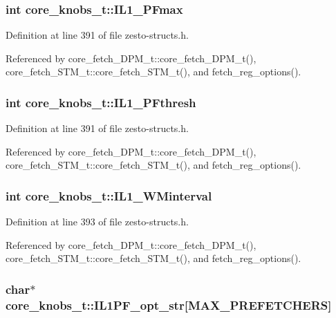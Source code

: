 \subsubsection[{IL1\_\-PFmax}]{\setlength{\rightskip}{0pt plus 5cm}int {\bf core\_\-knobs\_\-t::IL1\_\-PFmax}}\label{structcore__knobs__t_afc1c24917e1880ee984619e91c0c2ef}




Definition at line 391 of file zesto-structs.h.

Referenced by core\_\-fetch\_\-DPM\_\-t::core\_\-fetch\_\-DPM\_\-t(), core\_\-fetch\_\-STM\_\-t::core\_\-fetch\_\-STM\_\-t(), and fetch\_\-reg\_\-options().
\subsubsection[{IL1\_\-PFthresh}]{\setlength{\rightskip}{0pt plus 5cm}int {\bf core\_\-knobs\_\-t::IL1\_\-PFthresh}}\label{structcore__knobs__t_81cb78f98b406a4e4d02711775950a45}




Definition at line 391 of file zesto-structs.h.

Referenced by core\_\-fetch\_\-DPM\_\-t::core\_\-fetch\_\-DPM\_\-t(), core\_\-fetch\_\-STM\_\-t::core\_\-fetch\_\-STM\_\-t(), and fetch\_\-reg\_\-options().
\subsubsection[{IL1\_\-WMinterval}]{\setlength{\rightskip}{0pt plus 5cm}int {\bf core\_\-knobs\_\-t::IL1\_\-WMinterval}}\label{structcore__knobs__t_dcab08651b8fef497a98e71df1d59fe6}




Definition at line 393 of file zesto-structs.h.

Referenced by core\_\-fetch\_\-DPM\_\-t::core\_\-fetch\_\-DPM\_\-t(), core\_\-fetch\_\-STM\_\-t::core\_\-fetch\_\-STM\_\-t(), and fetch\_\-reg\_\-options().
\subsubsection[{IL1PF\_\-opt\_\-str}]{\setlength{\rightskip}{0pt plus 5cm}char$\ast$ {\bf core\_\-knobs\_\-t::IL1PF\_\-opt\_\-str}[MAX\_\-PREFETCHERS]}\label{structcore__knobs__t_dac46ccee7d80153f423be4258e3b6c0}




